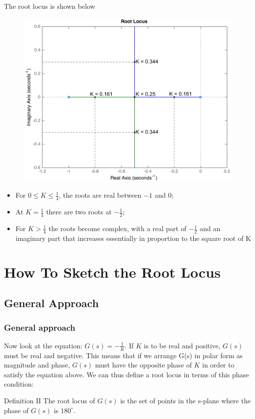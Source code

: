 \begin{frame}
	\begin{exampleblock}{}
		The root locus is shown below
		\begin{figure}
			\centering
			\includegraphics[width=0.7\linewidth]{root_locus_ex1}
		\end{figure}
	\end{exampleblock}
\end{frame}

\begin{frame}
	\begin{exampleblock}{}
		\begin{itemize}
		\item For $0\leq K \leq \frac{1}{4}$, the roots are real between $-1$ and $0$;
		\item At $K = \frac{1}{4}$ there are two roots at $-\frac{1}{2}$;
		\item For $K>\frac{1}{4}$ the roots become complex, with a real part of $-\frac{1}{2}$ and an imaginary part that increases essentially in proportion to the square root of K
		\end{itemize}
	\end{exampleblock}
\end{frame}

\section{How To Sketch the Root Locus}

\subsection{General Approach}

\begin{frame}
\frametitle{General approach}
	Now look at the equation: $G(s) = -\frac{1}{K}$. If $K$ is to be real and positive, $G(s)$ must be real and negative. This means that if we arrange G(s) in polar form as magnitude and phase, $G(s)$ must have the opposite phase of $K$ in order to satisfy the equation above. We can thus define a root locus in terms of this phase condition:  
	\vspace{0.5em}
	\begin{block}{Definition II}
		The root locus of $G(s)$ is the set of points in the s-plane where the phase of $G(s)$ is $180^{\circ}$.	
	\end{block}
\end{frame}

